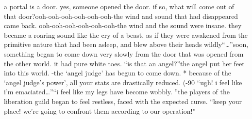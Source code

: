 a portal is a door.
 yes, someone opened the door.
 if so, what will come out of that door?ooh-ooh-ooh-ooh-ooh-ooh-the wind and sound that had disappeared came back.
ooh-ooh-ooh-ooh-ooh-ooh-the wind and the sound were insane.
 they became a roaring sound like the cry of a beast, as if they were awakened from the primitive nature that had been asleep, and blew above their heads wildly“…”soon, something began to come down very slowly from the door that was opened from the other world.
 it had pure white toes.
“is that an angel?”the angel put her feet into this world.
-the ‘angel judge’ has begun to come down.
* because of the ‘angel judge’s power’, all your stats are drastically reduced.
 (-90%
“ugh! i feel like i’m emaciated…”“i feel like my legs have become wobbly.
”the players of the liberation guild began to feel restless, faced with the expected curse.
“keep your place! we’re going to confront them according to our operation!”

 